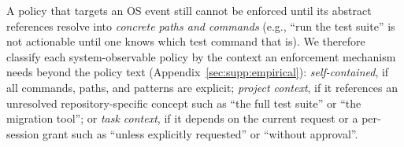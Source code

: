 


 A policy that targets an OS event still cannot be enforced until its abstract references resolve into \emph{concrete paths and commands} (e.g., ``run the test suite'' is not actionable until one knows which test command that is). We therefore classify each system-observable policy by the context an enforcement mechanism needs beyond the policy text (Appendix~\ref{sec:supp:empirical}): \emph{self-contained}, if all commands, paths, and patterns are explicit; \emph{project context}, if it references an unresolved repository-specific concept such as ``the full test suite'' or ``the migration tool''; or \emph{task context}, if it depends on the current request or a per-session grant such as ``unless explicitly requested'' or ``without approval''.

